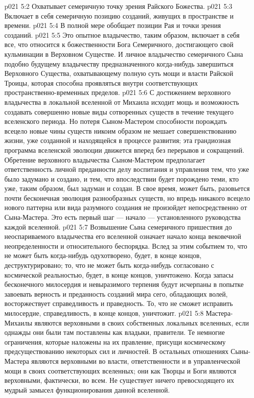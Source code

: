 \vs p021 5:2 \bibnobreakspace Охватывает семеричную точку зрения Райского Божества.
\vs p021 5:3 \bibnobreakspace Включает в себя семеричную позицию созданий, живущих в пространстве и времени.
\vs p021 5:4 \bibnobreakspace В полной мере обобщает позиции Рая и точки зрения созданий.
\vs p021 5:5 \pc Это опытное владычество, таким образом, включает в себя все, что относится к божественности Бога Семеричного, достигающего свой кульминации в Верховном Существе. И личное владычество семеричного Сына подобно будущему владычеству предназначенного когда\hyp{}нибудь завершиться Верховного Существа, охватывающему полную суть мощи и власти Райской Троицы, которая способна проявляться внутри соответствующих пространственно\hyp{}временных пределов.
\vs p021 5:6 \pc С достижением верховного владычества в локальной вселенной от Михаила исходит мощь и возможность создавать совершенно новые виды сотворенных существ в течение текущего вселенского периода. Но потеря Сыном\hyp{}Мастером способности порождать всецело новые чины существ никоим образом не мешает совершенствованию жизни, уже созданной и находящейся в процессе развития; эта грандиозная программа вселенской эволюции движется вперед без перерывов и сокращений. Обретение верховного владычества Сыном\hyp{}Мастером предполагает ответственность личной преданности делу воспитания и управления тем, что уже было задумано и создано, и тем, что впоследствии будет порождено теми, кто уже, таким образом, был задуман и создан. В свое время, может быть, разовьется почти бесконечная эволюция разнообразных существ, но впредь никакого всецело нового паттерна или вида разумного создания не произойдет непосредственно от Сына\hyp{}Мастера. Это есть первый шаг --- начало --- установленного руководства каждой вселенной.
\vs p021 5:7 Возвышение Сына семеричного пришествия до неоспариваемого владычества его вселенной означает начало конца вековечной неопределенности и относительного беспорядка. Вслед за этим событием то, что не может быть когда\hyp{}нибудь одухотворено, будет, в конце концов, деструктурировано; то, что не может быть когда\hyp{}нибудь согласовано с космической реальностью, будет, в конце концов, уничтожено. Когда запасы бесконечного милосердия и невыразимого терпения будут исчерпаны в попытке завоевать верность и преданность созданий мира сего, обладающих волей, восторжествует справедливость и праведность. То, что не сможет исправить милосердие, справедливость, в конце концов, уничтожит.
\vs p021 5:8 \pc Мастера\hyp{}Михаилы являются верховными в своих собственных локальных вселенных, если однажды они были там поставлены как владыки, правители. Те немногие ограничения, которые наложены на их правление, присущи космическому предсуществованию некоторых сил и личностей. В остальных отношениях Сыны\hyp{}Мастера являются верховными во власти, ответственности и в управленческой мощи в своих соответствующих вселенных; они как Творцы и Боги являются верховными, фактически, во всем. Не существует ничего превосходящего их мудрый замысел функционирования данной вселенной.
